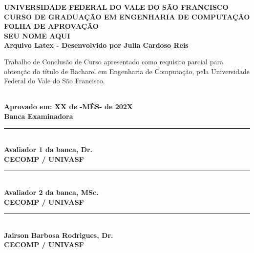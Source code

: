 \thispagestyle{empty}

\begin{center}
    
    \textbf{UNIVERSIDADE FEDERAL DO VALE DO SÃO FRANCISCO} \\
    \textbf{CURSO DE GRADUAÇÃO EM ENGENHARIA DE COMPUTAÇÃO} \\[1.5cm]
    
    \textbf{FOLHA DE APROVAÇÃO} \\[1.5cm]
    
    \textbf{SEU NOME AQUI} \\[1.5cm]
    
    \textbf{\Large Arquivo Latex - Desenvolvido por Julia Cardoso Reis} \\[1.5cm]

    \hspace*{0.5\textwidth}
    \begin{minipage}{0.5\textwidth}
        \small
        \begin{singlespace}
            Trabalho de Conclusão de Curso apresentado como requisito parcial para obtenção do título de Bacharel em Engenharia de Computação, pela Universidade Federal do Vale do São Francisco.
        \end{singlespace}
    \end{minipage} \\[1.5cm]

    \textbf{Aprovado em: XX de -MÊS- de 202X} \\[1.5cm]

    \textbf{Banca Examinadora} \\[1.2cm]

     \rule{10cm}{0.1mm} \\
    \textbf{Avaliador 1 da banca, Dr. } \\
    \textbf{CECOMP / UNIVASF} \\[1.1cm]

    \rule{10cm}{0.1mm} \\
    \textbf{Avaliador 2 da banca, MSc.} \\
    \textbf{CECOMP / UNIVASF} \\[1.1cm]

     \rule{10cm}{0.1mm} \\
    \textbf{Jairson Barbosa Rodrigues, Dr.} \\
    \textbf{CECOMP / UNIVASF}
    
\end{center}